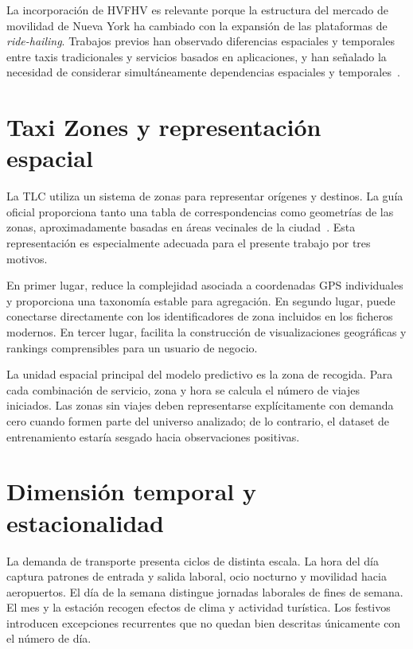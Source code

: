 La incorporación de HVFHV es relevante porque la estructura del mercado de movilidad de Nueva York ha cambiado con la expansión de las plataformas de \textit{ride-hailing}. Trabajos previos han observado diferencias espaciales y temporales entre taxis tradicionales y servicios basados en aplicaciones, y han señalado la necesidad de considerar simultáneamente dependencias espaciales y temporales~\cite{faghih2019,toman2020}.

\section{Taxi Zones y representación espacial}

La TLC utiliza un sistema de zonas para representar orígenes y destinos. La guía oficial proporciona tanto una tabla de correspondencias como geometrías de las zonas, aproximadamente basadas en áreas vecinales de la ciudad~\cite{nyctlc_userguide}. Esta representación es especialmente adecuada para el presente trabajo por tres motivos.

En primer lugar, reduce la complejidad asociada a coordenadas GPS individuales y proporciona una taxonomía estable para agregación. En segundo lugar, puede conectarse directamente con los identificadores de zona incluidos en los ficheros modernos. En tercer lugar, facilita la construcción de visualizaciones geográficas y rankings comprensibles para un usuario de negocio.

La unidad espacial principal del modelo predictivo es la zona de recogida. Para cada combinación de servicio, zona y hora se calcula el número de viajes iniciados. Las zonas sin viajes deben representarse explícitamente con demanda cero cuando formen parte del universo analizado; de lo contrario, el dataset de entrenamiento estaría sesgado hacia observaciones positivas.

\section{Dimensión temporal y estacionalidad}

La demanda de transporte presenta ciclos de distinta escala. La hora del día captura patrones de entrada y salida laboral, ocio nocturno y movilidad hacia aeropuertos. El día de la semana distingue jornadas laborales de fines de semana. El mes y la estación recogen efectos de clima y actividad turística. Los festivos introducen excepciones recurrentes que no quedan bien descritas únicamente con el número de día.

